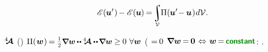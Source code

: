 \nopagebreak\vspace{-0.2em}
\begin{equation*}
\potentialenergyfunctional \hspace{.16ex} (\hspace{-0.1ex}\bm{u}'\hspace{.1ex}) \hspace{-0.2ex} -
\potentialenergyfunctional \hspace{.16ex} (\hspace{-0.1ex}\bm{u}\hspace{-0.1ex}) \hspace{-0.2ex}
= \hspace{-0.3ex}
\scalebox{0.9}{$\displaystyle\integral\displaylimits_{\mathcal{V}}$} \hspace{-0.22ex}
\potentialenergydensity (\hspace{-0.1ex}\bm{u}' \hspace{-0.4ex} - \hspace{-0.1ex} \bm{u}\hspace{.1ex})
\hspace{.1ex} d\mathcal{V}
.
\end{equation*}

 $\hspace{.08ex}{^4\hspace{-0.7ex}\bm{\mathcal{A}}}\hspace{.08ex}$
 ()
${\potentialenergydensity ( \hspace{.1ex}
\bm{w} \hspace{.1ex} ) \hspace{-0.2ex}
= \smallerdisplaystyleonehalf
\scalebox{.95}{$
   \boldnabla \bm{w}
   \hspace{-0.1ex} \dotdotp \hspace{-0.1ex}
   \stiffnesstensor \dotdotp \hspace{-0.25ex}
   \boldnabla \bm{w}
$}
\hspace{-0.1ex} \geq \hspace{-0.1ex} 0
\hspace{.8ex}
\forall \bm{w}
}$
(
${= \hspace{-0.2ex} 0}$
${
   \boldnabla \bm{w}
   \hspace{-0.2ex} = \hspace{-0.2ex}
   \zerovector
   \hspace{.2ex}\Leftrightarrow\hspace{.2ex}
   \bm{w}
   \hspace{-0.2ex} = \hspace{-0.2ex}
   \boldconstant
}$:
.

